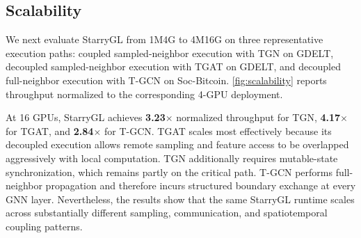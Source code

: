 \subsection{Scalability}
\label{sec:scalability}
We next evaluate StarryGL from 1M4G to 4M16G on three representative
execution paths: coupled sampled-neighbor execution with TGN on
GDELT, decoupled sampled-neighbor execution with TGAT on GDELT, and
decoupled full-neighbor execution with T-GCN on Soc-Bitcoin.
\autoref{fig:scalability} reports throughput normalized to
the corresponding 4-GPU deployment.

At 16 GPUs, StarryGL achieves \textbf{3.23$\times$} normalized
throughput for TGN, \textbf{4.17$\times$} for TGAT, and
\textbf{2.84$\times$} for T-GCN. TGAT scales most effectively because
its decoupled execution allows remote sampling and feature access to
be overlapped aggressively with local computation. TGN additionally
requires mutable-state synchronization, which remains partly on the
critical path. T-GCN performs full-neighbor propagation and therefore
incurs structured boundary exchange at every GNN layer. Nevertheless,
the results show that the same StarryGL runtime scales across
substantially different sampling, communication, and spatiotemporal coupling
patterns.
